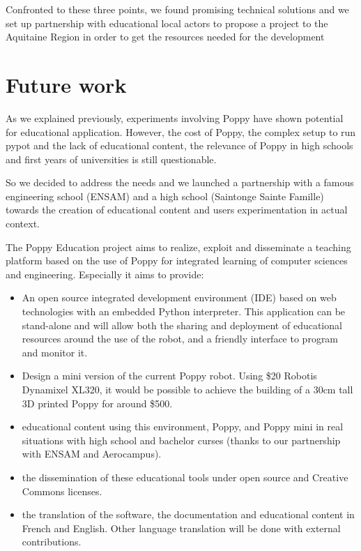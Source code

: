 Confronted to these three points, we found promising technical solutions and we set up partnership with educational local actors to propose a project to the Aquitaine Region in order to get the resources needed for the development


\section{Future work} %

As we explained previously, experiments involving Poppy have shown potential for educational application. However, the cost of Poppy, the complex setup to run pypot and the lack of educational content, the relevance of Poppy in high schools and first years of universities is still questionable.

So we decided to address the needs and we launched a partnership with a famous engineering school (ENSAM) and a high school (Saintonge Sainte Famille) towards the creation of educational content and users experimentation in actual context.

The Poppy Education project aims to realize, exploit and disseminate a teaching platform based on the use of Poppy for integrated learning of computer sciences and engineering. Especially it aims to provide:
\begin{itemize}
    \item An open source integrated development environment (IDE) based on web technologies with an embedded Python interpreter. This application can be stand-alone and will allow both the sharing and deployment of educational resources around the use of the robot, and a friendly interface to program and monitor it.
    \item Design a mini version of the current Poppy robot. Using \$20 Robotis Dynamixel XL320, it would be possible to achieve the building of a 30cm tall 3D printed Poppy for around \$500.
    \item educational content using this environment, Poppy, and Poppy mini in real situations with high school and bachelor curses (thanks to our partnership with ENSAM and Aerocampus).
    \item the dissemination of these educational tools under open source and Creative Commons licenses.
    \item the translation of the software, the documentation and educational content in French and English. Other language translation will be done with external contributions.
\end{itemize}








